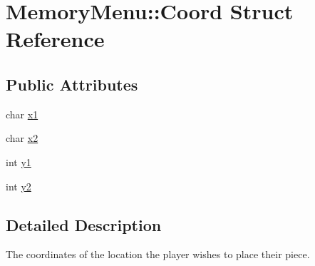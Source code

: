 \hypertarget{structMemoryMenu_1_1Coord}{\section{Memory\-Menu\-:\-:Coord Struct Reference}
\label{structMemoryMenu_1_1Coord}
}
\subsection*{Public Attributes}
\begin{DoxyCompactItemize}
\item 
char \hyperlink{structMemoryMenu_1_1Coord_a4c4b189ad28860428a4d67fc921b67c5}{x1}
\item 
char \hyperlink{structMemoryMenu_1_1Coord_a672b3842f9e422b25d4db1f55b3ed219}{x2}
\item 
int \hyperlink{structMemoryMenu_1_1Coord_a3917e8bcb72f3894e298141c094cd92c}{y1}
\item 
int \hyperlink{structMemoryMenu_1_1Coord_a6bc07dd964c2d5b87f2c0bf7fd66eee1}{y2}
\end{DoxyCompactItemize}


\subsection{Detailed Description}
The coordinates of the location the player wishes to place their piece. 

